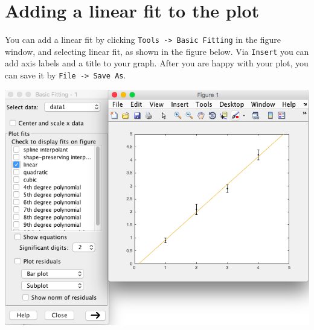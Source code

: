 \documentclass[a4paper]{article}
\begin{document}
\section*{Adding a linear fit to the plot}
You can add a linear fit by clicking \texttt{Tools -> Basic Fitting} in the figure window, and selecting linear fit, as shown in the figure below. Via \texttt{Insert} you can add axis labels and a title to your graph. After you are happy with your plot, you can save it by \texttt{File -> Save As}.

\includegraphics[width=\textwidth]{img.png}
\end{document}
